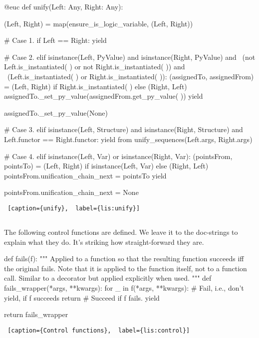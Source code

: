 \begin{minipage}{\linewidth}  \largev \hrulefill
\begin{python}[numbers=left]
@euc
def unify(Left: Any, Right: Any):

  (Left, Right) = map(ensure_is_logic_variable, (Left, Right))

  # Case 1.
  if Left == Right:
    yield

  # Case 2.
  elif isinstance(Left, PyValue) and isinstance(Right, PyValue) and \
       (not Left.is_instantiated( ) or not Right.is_instantiated( )) and \
       (Left.is_instantiated( ) or Right.is_instantiated( )):
    (assignedTo, assignedFrom) = (Left, Right) if Right.is_instantiated( ) else (Right, Left)
    assignedTo._set_py_value(assignedFrom.get_py_value( ))
    yield

    assignedTo._set_py_value(None)

  # Case 3.
  elif isinstance(Left, Structure) and isinstance(Right, Structure) and Left.functor == Right.functor:
    yield from unify_sequences(Left.args, Right.args)

  # Case 4.
  elif isinstance(Left, Var) or isinstance(Right, Var):
    (pointsFrom, pointsTo) = (Left, Right) if isinstance(Left, Var) else (Right, Left)
    pointsFrom.unification_chain_next = pointsTo
    yield

    pointsFrom.unification_chain_next = None

\end{python}
\begin{lstlisting} [caption={unify},  label={lis:unify}]
\end{lstlisting}
\end{minipage}

\subsection{}
The following control functions are defined. We leave it to the doc-strings to explain what they do. It's striking how straight-forward they are.

\begin{minipage}{\linewidth}  \largev \hrulefill
\begin{python}[numbers=left]
def fails(f):
  """
  Applied to a function so that the resulting function succeeds iff the original fails.
  Note that it is applied to the function itself, not to a function call.
  Similar to a decorator but applied explicitly when used.
  """
  def fails_wrapper(*args, **kwargs):
    for _ in f(*args, **kwargs):
      # Fail, i.e., don't yield, if f succeeds
      return  
    # Succeed if f fails.
    yield     

  return fails_wrapper
\end{python}
\begin{lstlisting} [caption={Control functions},  label={lis:control}]
\end{lstlisting}
\end{minipage}

